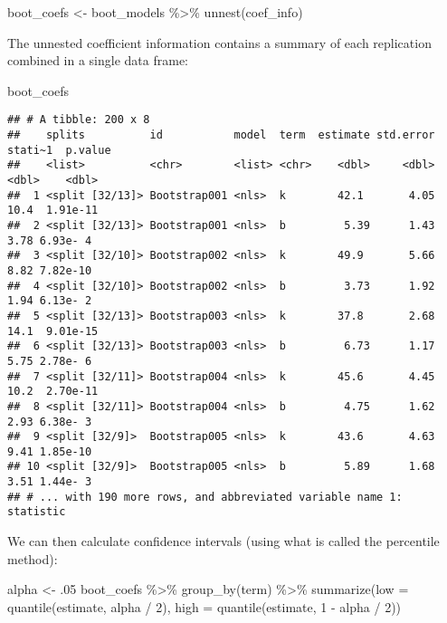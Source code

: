 \documentclass[
]{book}
\newenvironment{Shaded}{\begin{snugshade}}{\end{snugshade}}
\newcommand{\AttributeTok}[1]{\textcolor[rgb]{0.77,0.63,0.00}{#1}}
\newcommand{\DecValTok}[1]{\textcolor[rgb]{0.00,0.00,0.81}{#1}}
\newcommand{\FunctionTok}[1]{\textcolor[rgb]{0.00,0.00,0.00}{#1}}
\newcommand{\NormalTok}[1]{#1}
\newcommand{\OtherTok}[1]{\textcolor[rgb]{0.56,0.35,0.01}{#1}}
\newcommand{\SpecialCharTok}[1]{\textcolor[rgb]{0.00,0.00,0.00}{#1}}
\begin{document}
\begin{Shaded}
\begin{Highlighting}[]
\NormalTok{boot\_coefs }\OtherTok{\textless{}{-}}\NormalTok{ boot\_models }\SpecialCharTok{\%\textgreater{}\%} 
    \FunctionTok{unnest}\NormalTok{(coef\_info)}
\end{Highlighting}
\end{Shaded}

The unnested coefficient information contains a summary of each replication combined in a single data frame:

\begin{Shaded}
\begin{Highlighting}[]
\NormalTok{boot\_coefs}
\end{Highlighting}
\end{Shaded}

\begin{verbatim}
## # A tibble: 200 x 8
##    splits          id           model  term  estimate std.error stati~1  p.value
##    <list>          <chr>        <list> <chr>    <dbl>     <dbl>   <dbl>    <dbl>
##  1 <split [32/13]> Bootstrap001 <nls>  k        42.1       4.05   10.4  1.91e-11
##  2 <split [32/13]> Bootstrap001 <nls>  b         5.39      1.43    3.78 6.93e- 4
##  3 <split [32/10]> Bootstrap002 <nls>  k        49.9       5.66    8.82 7.82e-10
##  4 <split [32/10]> Bootstrap002 <nls>  b         3.73      1.92    1.94 6.13e- 2
##  5 <split [32/13]> Bootstrap003 <nls>  k        37.8       2.68   14.1  9.01e-15
##  6 <split [32/13]> Bootstrap003 <nls>  b         6.73      1.17    5.75 2.78e- 6
##  7 <split [32/11]> Bootstrap004 <nls>  k        45.6       4.45   10.2  2.70e-11
##  8 <split [32/11]> Bootstrap004 <nls>  b         4.75      1.62    2.93 6.38e- 3
##  9 <split [32/9]>  Bootstrap005 <nls>  k        43.6       4.63    9.41 1.85e-10
## 10 <split [32/9]>  Bootstrap005 <nls>  b         5.89      1.68    3.51 1.44e- 3
## # ... with 190 more rows, and abbreviated variable name 1: statistic
\end{verbatim}

We can then calculate confidence intervals (using what is called the percentile method):

\begin{Shaded}
\begin{Highlighting}[]
\NormalTok{alpha }\OtherTok{\textless{}{-}}\NormalTok{ .}\DecValTok{05}
\NormalTok{boot\_coefs }\SpecialCharTok{\%\textgreater{}\%} 
    \FunctionTok{group\_by}\NormalTok{(term) }\SpecialCharTok{\%\textgreater{}\%}
    \FunctionTok{summarize}\NormalTok{(}\AttributeTok{low =} \FunctionTok{quantile}\NormalTok{(estimate, alpha }\SpecialCharTok{/} \DecValTok{2}\NormalTok{),}
              \AttributeTok{high =} \FunctionTok{quantile}\NormalTok{(estimate, }\DecValTok{1} \SpecialCharTok{{-}}\NormalTok{ alpha }\SpecialCharTok{/} \DecValTok{2}\NormalTok{))}
\end{Highlighting}
\end{Shaded}
\end{document}
